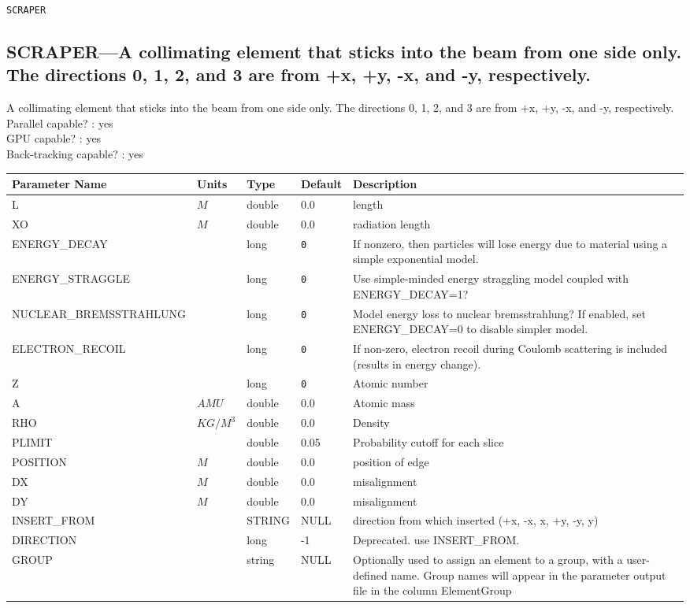 \vspace*{0.5in}

\newpage
\begin{center}{\Large\verb|SCRAPER|}\end{center}
\subsection{SCRAPER---A collimating element that sticks into the beam from one side only.  The directions 0, 1, 2, and 3 are from +x, +y, -x, and -y, respectively.}
A collimating element that sticks into the beam from one side only.  The directions 0, 1, 2, and 3 are from +x, +y, -x, and -y, respectively.
\\
Parallel capable? : yes\\
GPU capable? : yes\\
Back-tracking capable? : yes\\
\begin{tabular}{|l|l|l|l|p{\descwidth}|} \hline
Parameter Name & Units & Type & Default & Description \\ \hline 
L & $M$ & double &  0.0 & length  \\ \hline 
XO & $M$ & double &  0.0 & radiation length  \\ \hline 
ENERGY\_DECAY &  & long &  \verb|0| & If nonzero, then particles will lose energy due to material using a simple exponential model.  \\ \hline 
ENERGY\_STRAGGLE &  & long &  \verb|0| & Use simple-minded energy straggling model coupled with ENERGY\_DECAY=1?  \\ \hline 
NUCLEAR\_BREMSSTRAHLUNG &  & long &  \verb|0| & Model energy loss to nuclear bremsstrahlung? If enabled, set ENERGY\_DECAY=0 to disable simpler model.  \\ \hline 
ELECTRON\_RECOIL &  & long &  \verb|0| & If non-zero, electron recoil during Coulomb scattering is included (results in energy change).  \\ \hline 
Z &  & long &  \verb|0| & Atomic number  \\ \hline 
A & $AMU$ & double &  0.0 & Atomic mass  \\ \hline 
RHO & $KG/M^3$ & double &  0.0 & Density  \\ \hline 
PLIMIT &  & double &   0.05 & Probability cutoff for each slice  \\ \hline 
POSITION & $M$ & double &  0.0 & position of edge  \\ \hline 
DX & $M$ & double &  0.0 & misalignment  \\ \hline 
DY & $M$ & double &  0.0 & misalignment  \\ \hline 
INSERT\_FROM &  & STRING &   NULL            & direction from which inserted (+x, -x, x, +y, -y, y)  \\ \hline 
DIRECTION &  & long &   -1              & Deprecated. use INSERT\_FROM.  \\ \hline 
GROUP &  & string & NULL & Optionally used to assign an element to a group, with a user-defined name.  Group names will appear in the parameter output file in the column ElementGroup  \\ \hline 
\end{tabular}

